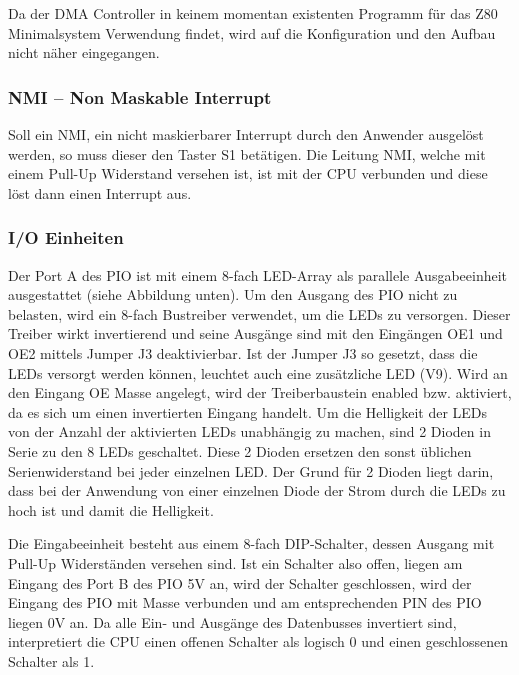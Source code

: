 Da der DMA Controller in keinem momentan existenten Programm für das Z80 Minimalsystem Verwendung findet, wird auf die Konfiguration und den Aufbau nicht näher eingegangen.

\subsubsection{NMI -- Non Maskable Interrupt}
Soll ein NMI, ein nicht maskierbarer Interrupt durch den Anwender ausgelöst werden, so muss dieser den Taster S1 betätigen. Die Leitung NMI, welche mit einem Pull-Up Widerstand versehen ist, ist mit der CPU verbunden und diese löst dann einen Interrupt aus.

\subsubsection{I/O Einheiten}
Der Port A des PIO ist mit einem 8-fach LED-Array als parallele Ausgabeeinheit ausgestattet (siehe Abbildung unten). Um den Ausgang des PIO nicht zu belasten, wird ein 8-fach Bustreiber verwendet, um die LEDs zu versorgen. Dieser Treiber wirkt invertierend und seine Ausgänge sind mit den Eingängen OE1 und OE2 mittels Jumper J3 deaktivierbar. Ist der Jumper J3 so gesetzt, dass die LEDs versorgt werden können, leuchtet auch eine zusätzliche LED (V9). Wird an den Eingang OE Masse angelegt, wird der Treiberbaustein enabled bzw. aktiviert, da es sich um einen invertierten Eingang handelt. Um die Helligkeit der LEDs von der Anzahl der aktivierten LEDs unabhängig zu machen, sind 2 Dioden in Serie zu den 8 LEDs geschaltet. Diese 2 Dioden ersetzen den sonst üblichen Serienwiderstand bei jeder einzelnen LED. Der Grund für 2 Dioden liegt darin, dass bei der Anwendung von einer einzelnen Diode der Strom durch die LEDs zu hoch ist und damit die Helligkeit.

Die Eingabeeinheit besteht aus einem 8-fach DIP-Schalter, dessen Ausgang mit Pull-Up Widerständen versehen sind. Ist ein Schalter also offen, liegen am Eingang des Port B des PIO 5V an, wird der Schalter geschlossen, wird der Eingang des PIO mit Masse verbunden und am entsprechenden PIN des PIO liegen 0V an. Da alle Ein- und Ausgänge des Datenbusses invertiert sind, interpretiert die CPU einen offenen Schalter als logisch 0 und einen geschlossenen Schalter als 1.

